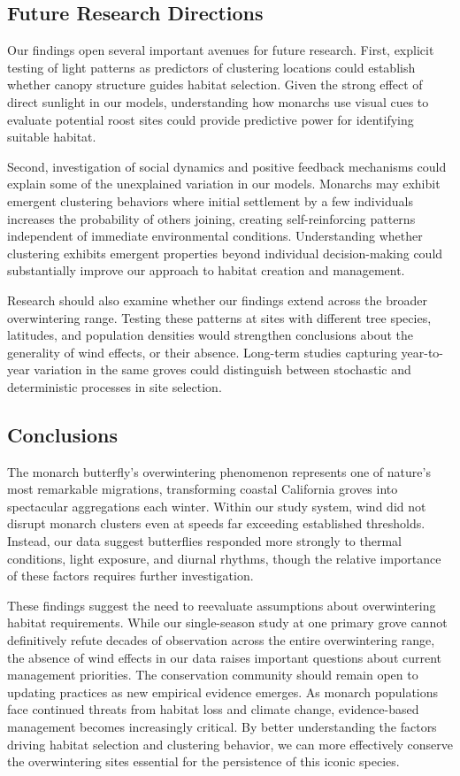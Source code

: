 \subsection{Future Research Directions}

Our findings open several important avenues for future research. First, explicit testing of light patterns as predictors of clustering locations could establish whether canopy structure guides habitat selection. Given the strong effect of direct sunlight in our models, understanding how monarchs use visual cues to evaluate potential roost sites could provide predictive power for identifying suitable habitat.

Second, investigation of social dynamics and positive feedback mechanisms could explain some of the unexplained variation in our models. Monarchs may exhibit emergent clustering behaviors where initial settlement by a few individuals increases the probability of others joining, creating self-reinforcing patterns independent of immediate environmental conditions. Understanding whether clustering exhibits emergent properties beyond individual decision-making could substantially improve our approach to habitat creation and management.

Research should also examine whether our findings extend across the broader overwintering range. Testing these patterns at sites with different tree species, latitudes, and population densities would strengthen conclusions about the generality of wind effects, or their absence. Long-term studies capturing year-to-year variation in the same groves could distinguish between stochastic and deterministic processes in site selection.

\subsection{Conclusions}

The monarch butterfly's overwintering phenomenon represents one of nature's most remarkable migrations, transforming coastal California groves into spectacular aggregations each winter. Within our study system, wind did not disrupt monarch clusters even at speeds far exceeding established thresholds. Instead, our data suggest butterflies responded more strongly to thermal conditions, light exposure, and diurnal rhythms, though the relative importance of these factors requires further investigation.

These findings suggest the need to reevaluate assumptions about overwintering habitat requirements. While our single-season study at one primary grove cannot definitively refute decades of observation across the entire overwintering range, the absence of wind effects in our data raises important questions about current management priorities. The conservation community should remain open to updating practices as new empirical evidence emerges. As monarch populations face continued threats from habitat loss and climate change, evidence-based management becomes increasingly critical. By better understanding the factors driving habitat selection and clustering behavior, we can more effectively conserve the overwintering sites essential for the persistence of this iconic species.